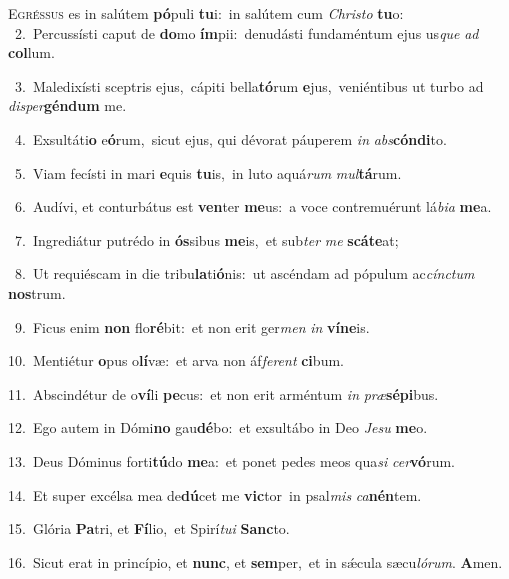 \lettrine{\initial\textcolor{\initialcolor}{E}}{gréssus} es in salútem \textbf{pó}\-puli \textbf{tu}\-i:~\star in salútem cum \textit{Chris}\-\textit{to} \textbf{tu}\-o:\\
{\numbfont\textcolor{\numbcolor}{~2.}}~Percussísti caput de \textbf{do}\-mo \textbf{ím}\-pii:~\star denudásti fundaméntum ejus us\textit{que} \textit{ad} \textbf{col}\-lum.\par
{\numbfont\textcolor{\numbcolor}{~3.}}~Maledixísti sceptris ejus,~\dagger cápiti bella\-\textbf{tó}\-rum \textbf{e}\-jus,~\star veniéntibus ut turbo ad \textit{di}\-\textit{sper}\textbf{gén}\textbf{dum} me.\par
{\numbfont\textcolor{\numbcolor}{~4.}}~Exsultáti\textbf{o} e\-\textbf{ó}\-rum,~\star sicut ejus, qui dévorat páuperem \textit{in} \textit{abs}\-\textbf{cón}\textbf{di}to.\par
{\numbfont\textcolor{\numbcolor}{~5.}}~Viam fecísti in mari \textbf{e}\-quis \textbf{tu}\-is,~\star in luto aquá\textit{rum} \textit{mul}\-\textbf{tá}rum.\par
{\numbfont\textcolor{\numbcolor}{~6.}}~Audívi, et conturbátus est \textbf{ven}\-ter \textbf{me}\-us:~\star a voce contremuérunt lá\-\textit{bi}\-\textit{a} \textbf{me}\-a.\par
{\numbfont\textcolor{\numbcolor}{~7.}}~Ingrediátur putrédo in \textbf{ós}\-sibus \textbf{me}\-is,~\star et sub\textit{ter} \textit{me} \textbf{scá}\-\textbf{te}at;\par
{\numbfont\textcolor{\numbcolor}{~8.}}~Ut requiéscam in die tribu\-\textbf{la}\-ti\-\textbf{ó}\-nis:~\star ut ascéndam ad pópulum ac\-\textit{cínc}\-\textit{tum} \textbf{nos}\-trum.\par
{\numbfont\textcolor{\numbcolor}{~9.}}~Ficus enim \textbf{non} flo\-\textbf{ré}\-bit:~\star et non erit ger\textit{men} \textit{in} \textbf{ví}\-\textbf{ne}is.\par
{\numbfont\textcolor{\numbcolor}{10.}}~Mentiétur \textbf{o}\-pus o\-\textbf{lí}\-væ:~\star et arva non áf\-\textit{fe}\-\textit{rent} \textbf{ci}\-bum.\par
{\numbfont\textcolor{\numbcolor}{11.}}~Abscindétur de o\-\textbf{ví}\-li \textbf{pe}\-cus:~\star et non erit arméntum \textit{in} \textit{præ}\-\textbf{sé}\textbf{pi}bus.\par
{\numbfont\textcolor{\numbcolor}{12.}}~Ego autem in Dómi\textbf{no} gau\-\textbf{dé}\-bo:~\star et exsultábo in Deo \textit{Je}\-\textit{su} \textbf{me}\-o.\par
{\numbfont\textcolor{\numbcolor}{13.}}~Deus Dóminus forti\-\textbf{tú}\-do \textbf{me}\-a:~\star et ponet pedes meos qua\textit{si} \textit{cer}\-\textbf{vó}rum.\par
{\numbfont\textcolor{\numbcolor}{14.}}~Et super excélsa mea de\-\textbf{dú}\-cet me \textbf{vic}\-tor~\star in psal\textit{mis} \textit{ca}\-\textbf{nén}tem.\par
{\numbfont\textcolor{\numbcolor}{15.}}~Glória \textbf{Pa}\-tri, et \textbf{Fí}\-lio,~\star et Spirí\-\textit{tu}\-\textit{i} \textbf{Sanc}\-to.\par
{\numbfont\textcolor{\numbcolor}{16.}}~Sicut erat in princípio, et \textbf{nunc}\-, et \textbf{sem}\-per,~\star et in sǽcula sæcu\-\textit{ló}\-\textit{rum}. \textbf{A}\-men.\par
